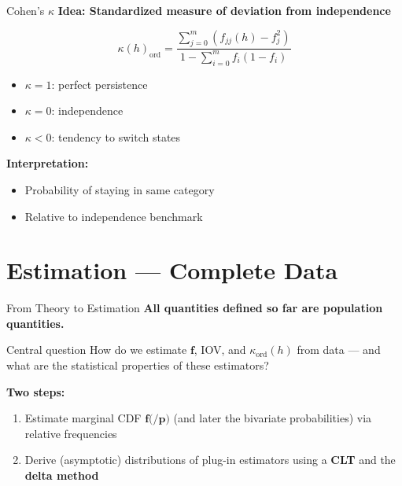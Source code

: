 \documentclass{beamer}
\begin{document}
\begin{frame}{Cohen's $\kappa$}
\textbf{Idea: Standardized measure of deviation from independence}

\vspace{0.5cm}

\[
\kappa(h)_{\mathrm{ord}} =
\frac{\sum_{j=0}^{m} (f_{jj}(h) - f_j^2)}
{1 - \sum_{i=0}^{m} f_i(1 - f_i)}
\]

\vspace{0.5cm}

\begin{itemize}
    \item $\kappa = 1$: perfect persistence
    \item $\kappa = 0$: independence
    \item $\kappa < 0$: tendency to switch states
\end{itemize}

\vspace{0.5cm}

\textbf{Interpretation:}
\begin{itemize}
    \item Probability of staying in same category
    \item Relative to independence benchmark
\end{itemize}
\end{frame}

\section{Estimation — Complete Data}

\begin{frame}{From Theory to Estimation}
\textbf{All quantities defined so far are population quantities.}

\vspace{0.4cm}

\begin{block}{Central question}
How do we estimate $\boldsymbol{f}$, IOV, and $\kappa_{\mathrm{ord}}(h)$ from data — and what are the statistical properties of these estimators?
\end{block}

\vspace{0.4cm}

\textbf{Two steps:}
\begin{enumerate}
    \item Estimate marginal CDF $\boldsymbol{f}\text{(/} \boldsymbol{p}\text{)}$ (and later the bivariate probabilities) via relative frequencies
    \item Derive (asymptotic) distributions of plug-in estimators using a \textbf{CLT} and the \textbf{delta method}
\end{enumerate}

\vspace{0.3cm}

\end{frame}
\end{document}
